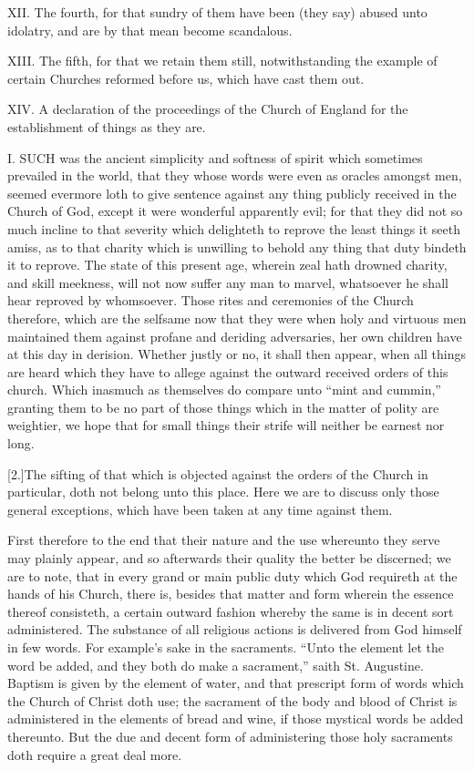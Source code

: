 XII. The fourth, for that sundry of them have been (they say) abused unto idolatry, and are by that mean become scandalous. 

XIII. The fifth, for that we retain them still, notwithstanding the example of certain Churches reformed before us, which have cast them out.

XIV. A declaration of the proceedings of the Church of England for the establishment of things as they are.

\PRLsep

I. SUCH was the ancient simplicity and softness of spirit which sometimes prevailed in the world, that they whose words were even as oracles amongst men, seemed evermore loth to give sentence against any thing publicly received in the Church of God, except it were wonderful apparently evil; for that they did not so much incline to that severity which delighteth to reprove the least things it seeth amiss, as to that charity which is unwilling to behold any thing that duty bindeth it to reprove. The state of this present age, wherein zeal hath drowned charity, and skill meekness, will not now suffer any man to marvel, whatsoever he shall hear reproved by whomsoever. Those rites and ceremonies of the Church therefore, which are the selfsame now that they were when holy and virtuous men maintained them against profane and deriding adversaries, her own children have at this day in derision. Whether justly or no, it shall then appear, when all things are heard which they have to allege against the outward received orders of this church. Which inasmuch as themselves do compare unto “mint and cummin,” granting them to be no part of those things which in the matter of polity are weightier, we hope that for small things their strife will neither be earnest nor long.

[2.]The sifting of that which is objected against the orders of the Church in particular, doth not belong unto this place. Here we are to discuss only those general exceptions, which have been taken at any time against them.

First therefore to the end that their nature and the use whereunto they serve may plainly appear, and so afterwards their quality the better be discerned; we are to note, that in every grand or main public duty which God requireth at the  hands of his Church, there is, besides that matter and form wherein the essence thereof consisteth, a certain outward fashion whereby the same is in decent sort administered. The substance of all religious actions is delivered from God himself in few words. For example’s sake in the sacraments. “Unto the element let the word be added, and they both do make a sacrament,” saith St. Augustine. Baptism is given by the element of water, and that prescript form of words which the Church of Christ doth use; the sacrament of the body and blood of Christ is administered in the elements of bread and wine, if those mystical words be added thereunto. But the due and decent form of administering those holy sacraments doth require a great deal more.

